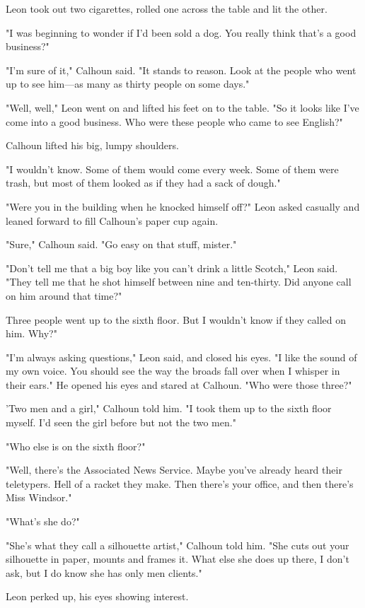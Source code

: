 \documentclass{novel}
\begin{document}
Leon took out two cigarettes, rolled one across the table and lit the other.

"I was beginning to wonder if I'd been sold a dog. You really think that's a good business?"

"I'm sure of it," Calhoun said. "It stands to reason. Look at the people who went up to see him—as many as thirty people on some days."

"Well, well," Leon went on and lifted his feet on to the table. "So it looks like I've come into a good business. Who were these people who came to see English?"

Calhoun lifted his big, lumpy shoulders.

"I wouldn't know. Some of them would come every week. Some of them were trash, but most of them looked as if they had a sack of dough."

"Were you in the building when he knocked himself off?" Leon asked casually and leaned forward to fill Calhoun's paper cup again.

"Sure," Calhoun said. "Go easy on that stuff, mister."

"Don't tell me that a big boy like you can't drink a little Scotch," Leon said. "They tell me that he shot himself between nine and ten-thirty. Did anyone call on him around that time?"

Three people went up to the sixth floor. But I wouldn't know if they called on him. Why?"

"I'm always asking questions," Leon said, and closed his eyes. "I like the sound of my own voice. You should see the way the broads fall over when I whisper in their ears." He opened his eyes and stared at Calhoun. "Who were those three?"

'Two men and a girl," Calhoun told him. "I took them up to the sixth floor myself. I'd seen the girl before but not the two men."

"Who else is on the sixth floor?"

"Well, there's the Associated News Service. Maybe you've already heard their teletypers. Hell of a racket they make. Then there's your office, and then there's Miss Windsor."

"What's she do?"

"She's what they call a silhouette artist," Calhoun told him. "She cuts out your silhouette in paper, mounts and frames it. What else she does up there, I don't ask, but I do know she has only men clients."

Leon perked up, his eyes showing interest.
\end{document}
